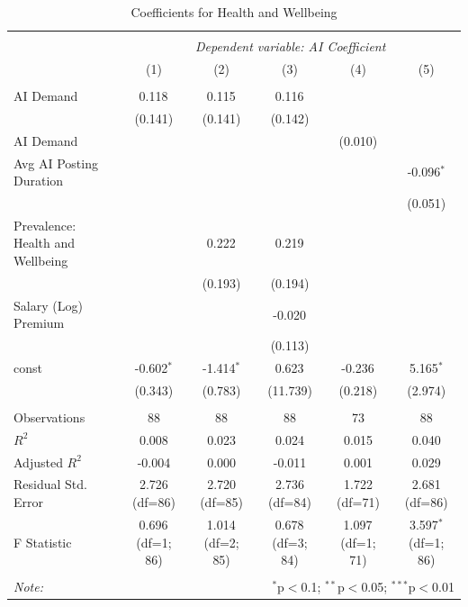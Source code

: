 \begin{table}[!htbp] \centering
  \caption{Coefficients for Health and Wellbeing}
\begin{tabular}{@{\extracolsep{5pt}}lccccc}
\\[-1.8ex]\hline
\hline \\[-1.8ex]
& \multicolumn{5}{c}{\textit{Dependent variable: AI Coefficient}} \
\cr \cline{2-6}
\\[-1.8ex] & (1) & (2) & (3) & (4) & (5) \\
\hline \\[-1.8ex]
 AI Demand & 0.118$^{}$ & 0.115$^{}$ & 0.116$^{}$ & & \\
& (0.141) & (0.141) & (0.142) & & \\
 AI Demand %
& & & & (0.010) & \\
 Avg AI Posting Duration & & & & & -0.096$^{*}$ \\
& & & & & (0.051) \\
 Prevalence: Health and Wellbeing & & 0.222$^{}$ & 0.219$^{}$ & & \\
& & (0.193) & (0.194) & & \\
 Salary (Log) Premium & & & -0.020$^{}$ & & \\
& & & (0.113) & & \\
 const & -0.602$^{*}$ & -1.414$^{*}$ & 0.623$^{}$ & -0.236$^{}$ & 5.165$^{*}$ \\
& (0.343) & (0.783) & (11.739) & (0.218) & (2.974) \\
\hline \\[-1.8ex]
 Observations & 88 & 88 & 88 & 73 & 88 \\
 $R^2$ & 0.008 & 0.023 & 0.024 & 0.015 & 0.040 \\
 Adjusted $R^2$ & -0.004 & 0.000 & -0.011 & 0.001 & 0.029 \\
 Residual Std. Error & 2.726 (df=86) & 2.720 (df=85) & 2.736 (df=84) & 1.722 (df=71) & 2.681 (df=86) \\
 F Statistic & 0.696$^{}$ (df=1; 86) & 1.014$^{}$ (df=2; 85) & 0.678$^{}$ (df=3; 84) & 1.097$^{}$ (df=1; 71) & 3.597$^{*}$ (df=1; 86) \\
\hline
\hline \\[-1.8ex]
\textit{Note:} & \multicolumn{5}{r}{$^{*}$p$<$0.1; $^{**}$p$<$0.05; $^{***}$p$<$0.01} \\
\end{tabular}
\end{table}